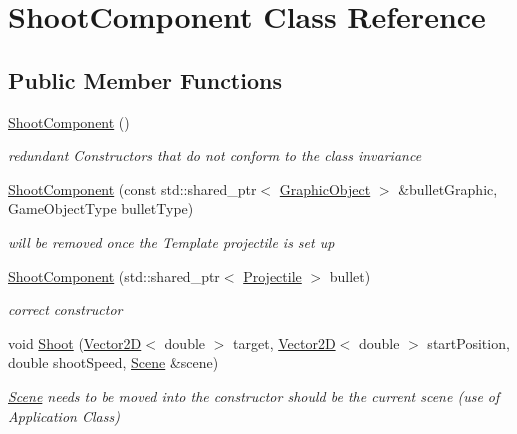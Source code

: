 \hypertarget{class_shoot_component}{}\section{Shoot\+Component Class Reference}
\label{class_shoot_component}
\subsection*{Public Member Functions}
\begin{DoxyCompactItemize}
\item 
\mbox{\label{class_shoot_component_acfbe65399cebcc06d04eeb18807642f5}} 
\hyperlink{class_shoot_component_acfbe65399cebcc06d04eeb18807642f5}{Shoot\+Component} ()
\begin{DoxyCompactList}\small\item\em redundant Constructors that do not conform to the class invariance \end{DoxyCompactList}\item 
\hyperlink{class_shoot_component_a3c0334d147d54522d58a379d6e473006}{Shoot\+Component} (const std\+::shared\+\_\+ptr$<$ \hyperlink{class_graphic_object}{Graphic\+Object} $>$ \&bullet\+Graphic, Game\+Object\+Type bullet\+Type)
\begin{DoxyCompactList}\small\item\em will be removed once the Template projectile is set up \end{DoxyCompactList}\item 
\hyperlink{class_shoot_component_a38ab688c7cf0775b4f15124a1c02bfc7}{Shoot\+Component} (std\+::shared\+\_\+ptr$<$ \hyperlink{class_projectile}{Projectile} $>$ bullet)
\begin{DoxyCompactList}\small\item\em correct constructor \end{DoxyCompactList}\item 
void \hyperlink{class_shoot_component_a27a553ba952e96c77bc6e7d2e5ca9f0a}{Shoot} (\hyperlink{class_vector2_d}{Vector2D}$<$ double $>$ target, \hyperlink{class_vector2_d}{Vector2D}$<$ double $>$ start\+Position, double shoot\+Speed, \hyperlink{class_scene}{Scene} \&scene)
\begin{DoxyCompactList}\small\item\em \hyperlink{class_scene}{Scene} needs to be moved into the constructor should be the current scene (use of Application Class) \end{DoxyCompactList}\end{DoxyCompactItemize}


